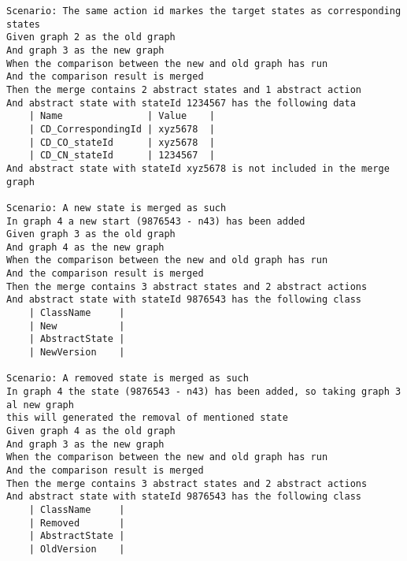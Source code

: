 \begin{lstlisting}[language=Gherkin, caption=Test Scenario's, label=code:gherkin-tests]
Scenario: The same action id markes the target states as corresponding states
Given graph 2 as the old graph
And graph 3 as the new graph
When the comparison between the new and old graph has run
And the comparison result is merged
Then the merge contains 2 abstract states and 1 abstract action
And abstract state with stateId 1234567 has the following data
    | Name               | Value    |
    | CD_CorrespondingId | xyz5678  |
    | CD_CO_stateId      | xyz5678  |
    | CD_CN_stateId      | 1234567  |
And abstract state with stateId xyz5678 is not included in the merge graph

Scenario: A new state is merged as such
In graph 4 a new start (9876543 - n43) has been added
Given graph 3 as the old graph
And graph 4 as the new graph
When the comparison between the new and old graph has run
And the comparison result is merged
Then the merge contains 3 abstract states and 2 abstract actions
And abstract state with stateId 9876543 has the following class
    | ClassName     |
    | New           |
    | AbstractState |
    | NewVersion    |

Scenario: A removed state is merged as such
In graph 4 the state (9876543 - n43) has been added, so taking graph 3 al new graph
this will generated the removal of mentioned state
Given graph 4 as the old graph
And graph 3 as the new graph
When the comparison between the new and old graph has run
And the comparison result is merged
Then the merge contains 3 abstract states and 2 abstract actions
And abstract state with stateId 9876543 has the following class
    | ClassName     |
    | Removed       |
    | AbstractState |
    | OldVersion    |

\end{lstlisting}